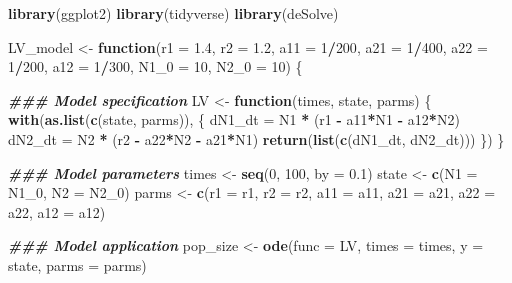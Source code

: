 \documentclass[
]{book}
\newenvironment{Shaded}{\begin{snugshade}}{\end{snugshade}}
\newcommand{\AttributeTok}[1]{\textcolor[rgb]{0.13,0.29,0.53}{#1}}
\newcommand{\ControlFlowTok}[1]{\textcolor[rgb]{0.13,0.29,0.53}{\textbf{#1}}}
\newcommand{\DecValTok}[1]{\textcolor[rgb]{0.00,0.00,0.81}{#1}}
\newcommand{\DocumentationTok}[1]{\textcolor[rgb]{0.56,0.35,0.01}{\textbf{\textit{#1}}}}
\newcommand{\FloatTok}[1]{\textcolor[rgb]{0.00,0.00,0.81}{#1}}
\newcommand{\FunctionTok}[1]{\textcolor[rgb]{0.13,0.29,0.53}{\textbf{#1}}}
\newcommand{\NormalTok}[1]{#1}
\newcommand{\OtherTok}[1]{\textcolor[rgb]{0.56,0.35,0.01}{#1}}
\newcommand{\SpecialCharTok}[1]{\textcolor[rgb]{0.81,0.36,0.00}{\textbf{#1}}}
\begin{document}
\begin{Shaded}
\begin{Highlighting}[]
\FunctionTok{library}\NormalTok{(ggplot2)}
\FunctionTok{library}\NormalTok{(tidyverse)}
\FunctionTok{library}\NormalTok{(deSolve)}

\NormalTok{LV\_model }\OtherTok{\textless{}{-}} \ControlFlowTok{function}\NormalTok{(}\AttributeTok{r1 =} \FloatTok{1.4}\NormalTok{, }\AttributeTok{r2 =} \FloatTok{1.2}\NormalTok{, }\AttributeTok{a11 =} \DecValTok{1}\SpecialCharTok{/}\DecValTok{200}\NormalTok{, }\AttributeTok{a21 =} \DecValTok{1}\SpecialCharTok{/}\DecValTok{400}\NormalTok{, }\AttributeTok{a22 =} \DecValTok{1}\SpecialCharTok{/}\DecValTok{200}\NormalTok{, }\AttributeTok{a12 =} \DecValTok{1}\SpecialCharTok{/}\DecValTok{300}\NormalTok{, }\AttributeTok{N1\_0 =} \DecValTok{10}\NormalTok{, }\AttributeTok{N2\_0 =} \DecValTok{10}\NormalTok{) \{}

  \DocumentationTok{\#\#\# Model specification}
\NormalTok{  LV }\OtherTok{\textless{}{-}} \ControlFlowTok{function}\NormalTok{(times, state, parms) \{}
    \FunctionTok{with}\NormalTok{(}\FunctionTok{as.list}\NormalTok{(}\FunctionTok{c}\NormalTok{(state, parms)), \{}
\NormalTok{      dN1\_dt }\OtherTok{=}\NormalTok{ N1 }\SpecialCharTok{*}\NormalTok{ (r1 }\SpecialCharTok{{-}}\NormalTok{ a11}\SpecialCharTok{*}\NormalTok{N1 }\SpecialCharTok{{-}}\NormalTok{ a12}\SpecialCharTok{*}\NormalTok{N2)}
\NormalTok{      dN2\_dt }\OtherTok{=}\NormalTok{ N2 }\SpecialCharTok{*}\NormalTok{ (r2 }\SpecialCharTok{{-}}\NormalTok{ a22}\SpecialCharTok{*}\NormalTok{N2 }\SpecialCharTok{{-}}\NormalTok{ a21}\SpecialCharTok{*}\NormalTok{N1)}
      \FunctionTok{return}\NormalTok{(}\FunctionTok{list}\NormalTok{(}\FunctionTok{c}\NormalTok{(dN1\_dt, dN2\_dt)))}
\NormalTok{    \})}
\NormalTok{  \}}

  \DocumentationTok{\#\#\# Model parameters}
\NormalTok{  times }\OtherTok{\textless{}{-}} \FunctionTok{seq}\NormalTok{(}\DecValTok{0}\NormalTok{, }\DecValTok{100}\NormalTok{, }\AttributeTok{by =} \FloatTok{0.1}\NormalTok{)}
\NormalTok{  state }\OtherTok{\textless{}{-}} \FunctionTok{c}\NormalTok{(}\AttributeTok{N1 =}\NormalTok{ N1\_0, }\AttributeTok{N2 =}\NormalTok{ N2\_0)}
\NormalTok{  parms }\OtherTok{\textless{}{-}} \FunctionTok{c}\NormalTok{(}\AttributeTok{r1 =}\NormalTok{ r1, }\AttributeTok{r2 =}\NormalTok{ r2, }\AttributeTok{a11 =}\NormalTok{ a11, }\AttributeTok{a21 =}\NormalTok{ a21, }\AttributeTok{a22 =}\NormalTok{ a22, }\AttributeTok{a12 =}\NormalTok{ a12)}

  \DocumentationTok{\#\#\# Model application}
\NormalTok{  pop\_size }\OtherTok{\textless{}{-}} \FunctionTok{ode}\NormalTok{(}\AttributeTok{func =}\NormalTok{ LV, }\AttributeTok{times =}\NormalTok{ times, }\AttributeTok{y =}\NormalTok{ state, }\AttributeTok{parms =}\NormalTok{ parms)}


\end{Highlighting}
\end{Shaded}
\end{document}
